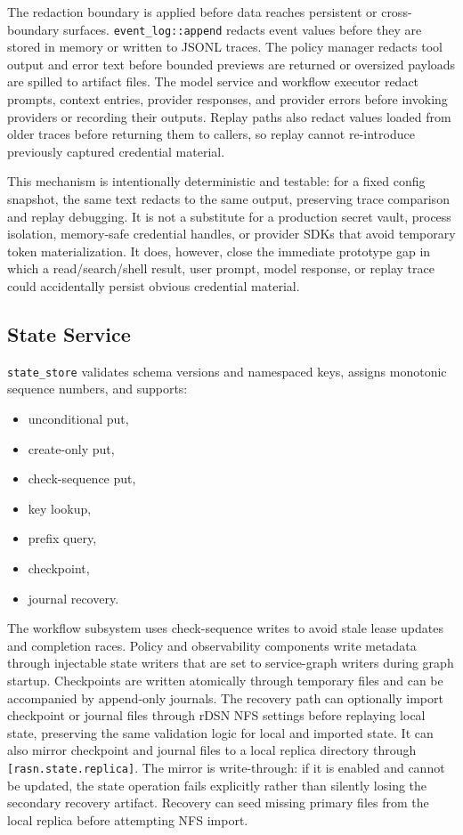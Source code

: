 \documentclass[manuscript,screen,review]{acmart}
\begin{document}
The redaction boundary is applied before data reaches persistent or
cross-boundary surfaces. \texttt{event\_log::append} redacts event values before
they are stored in memory or written to JSONL traces. The policy manager redacts
tool output and error text before bounded previews are returned or oversized
payloads are spilled to artifact files. The model service and workflow executor
redact prompts, context entries, provider responses, and provider errors before
invoking providers or recording their outputs. Replay paths also redact values
loaded from older traces before returning them to callers, so replay cannot
re-introduce previously captured credential material.

This mechanism is intentionally deterministic and testable: for a fixed config
snapshot, the same text redacts to the same output, preserving trace comparison
and replay debugging. It is not a substitute for a production secret vault,
process isolation, memory-safe credential handles, or provider SDKs that avoid
temporary token materialization. It does, however, close the immediate prototype
gap in which a read/search/shell result, user prompt, model response, or replay
trace could accidentally persist obvious credential material.

\subsection{State Service}

\texttt{state\_store} validates schema versions and namespaced keys, assigns
monotonic sequence numbers, and supports:

\begin{itemize}
  \item unconditional put,
  \item create-only put,
  \item check-sequence put,
  \item key lookup,
  \item prefix query,
  \item checkpoint,
  \item journal recovery.
\end{itemize}

The workflow subsystem uses check-sequence writes to avoid stale lease updates
and completion races. Policy and observability components write metadata
through injectable state writers that are set to service-graph writers during
graph startup. Checkpoints are written atomically through temporary files and
can be accompanied by append-only journals. The recovery path can optionally
import checkpoint or journal files through rDSN NFS settings before replaying
local state, preserving the same validation logic for local and imported state.
It can also mirror checkpoint and journal files to a local replica directory
through \texttt{[rasn.state.replica]}. The mirror is write-through: if it is
enabled and cannot be updated, the state operation fails explicitly rather than
silently losing the secondary recovery artifact. Recovery can seed missing
primary files from the local replica before attempting NFS import.
\end{document}

